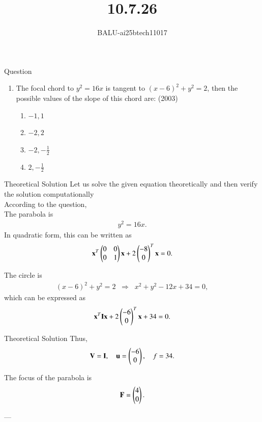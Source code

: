 \documentclass{beamer}
\title %
{10.7.26}
\author %
{BALU-ai25btech11017}
\begin{document}
\frame{\titlepage}
\begin{frame}{Question}
\begin{enumerate}
    \item The focal chord to \( y^2 = 16x \) is tangent to \( (x - 6)^2 + y^2 = 2 \), then the possible values of the slope of this chord are: (2003)
    \begin{enumerate}
        \item \( -1, 1 \)
        \item \( -2, 2 \)
        \item \( -2, -\frac{1}{2} \)
        \item \( 2, -\frac{1}{2} \)
    \end{enumerate}
\end{enumerate}
\end{frame}
\begin{frame}{Theoretical Solution}
Let us solve the given equation theoretically and then verify the solution computationally \\
According to the question, \\
The parabola is
\begin{align}
y^{2} = 16x.
\end{align}
In quadratic form, this can be written as
\begin{align}
\mathbf{x}^{T}
\begin{pmatrix}0 & 0 \\ 0 & 1\end{pmatrix}
\mathbf{x}
+
2\begin{pmatrix}-8 \\ 0\end{pmatrix}^{T}\mathbf{x} = 0.
\end{align}

The circle is
\begin{align}
(x-6)^{2}+y^{2}=2 \;\;\Rightarrow\;\; x^{2}+y^{2}-12x+34=0,
\end{align}
which can be expressed as
\begin{align}
\mathbf{x}^{T}\mathbf{I}\mathbf{x} + 2
\begin{pmatrix}-6 \\ 0\end{pmatrix}^{T}\mathbf{x} + 34 = 0.
\end{align}






\end{frame}
\begin{frame}{Theoretical Solution}
Thus,
\begin{align}
\mathbf{V} = \mathbf{I},\quad
\mathbf{u} = \begin{pmatrix}-6 \\ 0\end{pmatrix},\quad
f = 34.
\end{align}

The focus of the parabola is
\begin{align}
\mathbf{F} = \begin{pmatrix}4 \\ 0\end{pmatrix}.
\end{align}

---


\end{frame}
\end{document}

